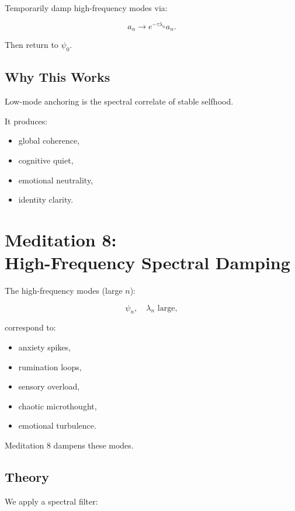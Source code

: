 \documentclass[12pt]{article}
\begin{document}
Temporarily damp high-frequency modes via:

\[
a_n \to e^{-\tau\lambda_n} a_n.
\]

Then return to $\psi_0$.

\section{Why This Works}

Low-mode anchoring is the spectral correlate of stable selfhood.

It produces:

\begin{itemize}
    \item global coherence,
    \item cognitive quiet,
    \item emotional neutrality,
    \item identity clarity.
\end{itemize}

\newpage

\chapter{Meditation 8:\\ High-Frequency Spectral Damping}

The high-frequency modes (large $n$):

\[
\psi_n,\quad \lambda_n\text{ large},
\]

correspond to:

\begin{itemize}
    \item anxiety spikes,
    \item rumination loops,
    \item sensory overload,
    \item chaotic microthought,
    \item emotional turbulence.
\end{itemize}

Meditation 8 dampens these modes.

\section{Theory}

We apply a spectral filter:
\end{document}
